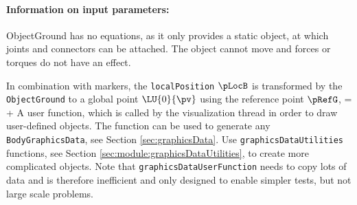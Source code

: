 \paragraph{Information on input parameters:} 
\finishTable
 \noindent
    ObjectGround has no equations, as it only provides a static object, at which joints and connectors can be attached. 
    The object cannot move and forces or torques do not have an effect. 
    
    In combination with markers, the \texttt{localPosition} $\pLocB$ is transformed by the \texttt{ObjectGround} to
    a global point $\LU{0}{\pv}$ using the reference point $\pRefG$,
    \be
       = \pRefG +  \pLocB \eqDot
    \ee
    A user function, which is called by the visualization thread in order to draw user-defined objects.
    The function can be used to generate any \texttt{BodyGraphicsData}, see Section \ref{sec:graphicsData}.
    Use \texttt{graphicsDataUtilities} functions, see Section \ref{sec:module:graphicsDataUtilities}, to create more complicated objects. 
    Note that \texttt{graphicsDataUserFunction} needs to copy lots of data and is therefore
    inefficient and only designed to enable simpler tests, but not large scale problems.
    \finishTable
    \userFunctionExample{}
    \pythonstyle
